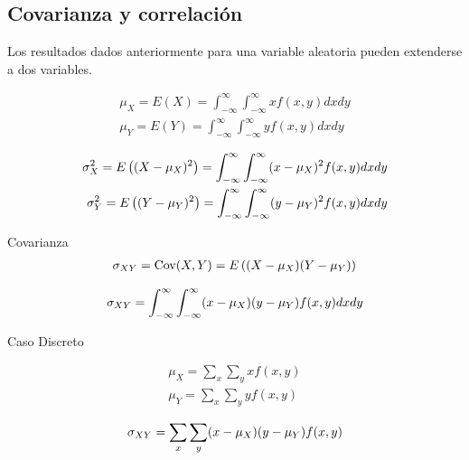 \subsection{Covarianza y correlación}

Los resultados dados anteriormente para una variable aleatoria pueden extenderse a dos variables.


{}

\begin{equation}
 \label{eq:3.43}
 \begin{split}
  \mu_{X}=E(X)=\int_{-\infty}^{\infty}\int_{-\infty}^{\infty} xf(x,y)dxdy\\ 
  \mu_{Y}=E(Y)=\int_{-\infty}^{\infty}\int_{-\infty}^{\infty}
  yf(x,y)dxdy
 \end{split}
\end{equation}





\begin{equation}
 \label{eq:3.44}
 \begin{split}
  \sigma^{2}_{X}=E\left( (X-\mu_{X})^{2} \right)=\int_{-\infty}^{\infty}\int_{-\infty}^{\infty} (x-\mu_{X})^2f(x,y)dxdy\\ 
  \sigma^{2}_{Y}=E\left( (Y-\mu_{Y})^{2} \right)=\int_{-\infty}^{\infty}\int_{-\infty}^{\infty} (y-\mu_{Y})^2f(x,y)dxdy
 \end{split}
\end{equation}


{Covarianza}
 \begin{align}
 \label{eq:3.45}
  \sigma_{XY}=\operatorname{Cov}(X,Y)=E\left( (X-\mu_{X})(Y-\mu_{Y}) \right)
 \end{align}



 \begin{align}
  \label{eq:3.46}
  \sigma_{XY}=\int_{-\infty}^{\infty}
  \int_{-\infty}^{\infty}
  (x-\mu_{X})(y-\mu_{Y})f(x,y)dxdy
 \end{align}


{Caso Discreto}

 \begin{equation}
  \begin{split}
   \mu_{X}=\sum_{x}\sum_{y}xf(x,y) \\
  \mu_{Y}=\sum_{x}\sum_{y}yf(x,y)
  \end{split}
 \end{equation}



 \begin{align}
  \label{eq:3.48}
  \sigma_{XY}=\sum_{x}\sum_{y}(x-\mu_{X})(y-\mu_{Y})f(x,y)
 \end{align}



